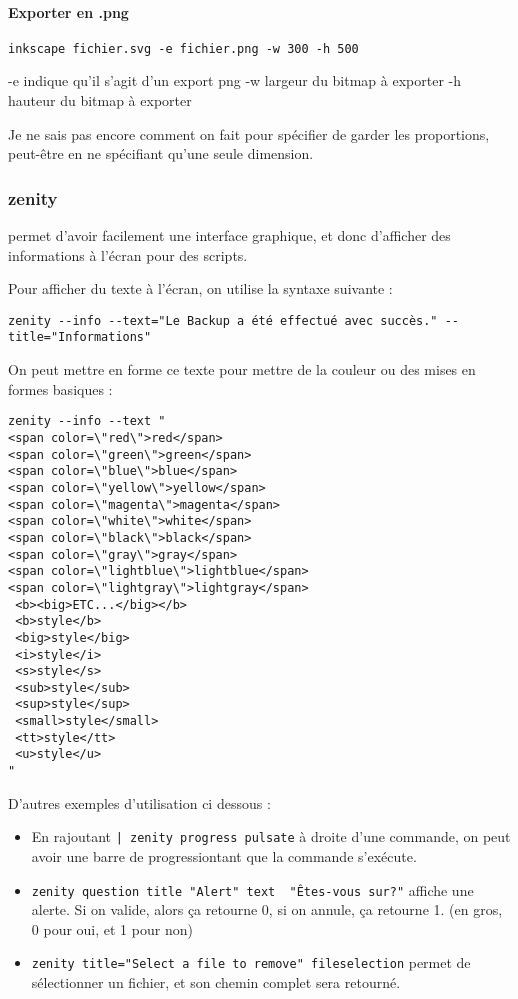 \documentclass[a4paper,twoside]{article}
\begin{document}
\paragraph{Exporter en .png}
\begin{verbatim}
inkscape fichier.svg -e fichier.png -w 300 -h 500
\end{verbatim}

-e indique qu'il s'agit d'un export png
-w largeur du bitmap à exporter
-h hauteur du bitmap à exporter

\begin{remarque}
Je ne sais pas encore comment on fait pour spécifier de garder les proportions, peut-être en ne spécifiant qu'une seule dimension.
\end{remarque}

\subsubsection{zenity}\label{sec:zenity}
 permet d'avoir facilement une interface graphique, et donc d'afficher des informations à l'écran pour des scripts.

Pour afficher du texte à l'écran, on utilise la syntaxe suivante :

\begin{verbatim}
zenity --info --text="Le Backup a été effectué avec succès." --title="Informations"
\end{verbatim}

On peut mettre en forme ce texte pour mettre de la couleur ou des mises en formes basiques :
\begin{verbatim}
zenity --info --text "
<span color=\"red\">red</span>
<span color=\"green\">green</span>
<span color=\"blue\">blue</span>
<span color=\"yellow\">yellow</span>
<span color=\"magenta\">magenta</span>
<span color=\"white\">white</span>
<span color=\"black\">black</span>
<span color=\"gray\">gray</span>
<span color=\"lightblue\">lightblue</span>
<span color=\"lightgray\">lightgray</span>
 <b><big>ETC...</big></b>
 <b>style</b>
 <big>style</big>
 <i>style</i>
 <s>style</s>
 <sub>style</sub>
 <sup>style</sup>
 <small>style</small>
 <tt>style</tt>
 <u>style</u>
"
\end{verbatim}

D'autres exemples d'utilisation ci dessous :
\begin{itemize}
\item En rajoutant \verb#| zenity progress pulsate# à droite d'une commande, on peut avoir une barre de \og progression\fg tant que la commande s'exécute.
\item \verb|zenity question title "Alert" text  "Êtes-vous sur?"| affiche une alerte. Si on valide, alors ça retourne 0, si on annule, ça retourne 1. (en gros, 0 pour oui, et 1 pour non)
\item \verb|zenity title="Select a file to remove" fileselection| permet de sélectionner un fichier, et son chemin complet sera retourné.
\end{itemize}
\end{document}
